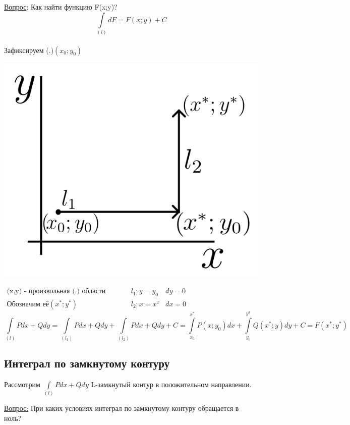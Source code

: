 \documentclass[12pt]{article}
\let\ORIincludegraphics\includegraphics
\renewcommand{\includegraphics}[2][]{\ORIincludegraphics[scale=0.65,#1]{#2}}
\let\oldint\int
\renewcommand{\int}{\oldint\limits}
\begin{document}
  
  \begin{minipage}{0.55\textwidth}
    \underline{Вопрос}: Как найти функцию F(x;y)?\\
    \[\int_{(l)}dF=F(x;y)+C\]\\
    Зафиксируем (.)$(x_0;y_0)$
  \end{minipage}
  \hspace{1em}
  \begin{minipage}{0.45\textwidth}
    \includegraphics[scale=0.6]{8.7.2.png}
  \end{minipage}
  \vspace{1em}
  \par
  $\begin{matrix}
    \text{(x,y) - произвольная (.) области } & \hspace{20pt} & l_1: y=y_0 & dy=0\\
    \text{Обозначим её} (x^*;y^*) & \hspace{20pt} & l_2:x=x^x & dx=0
  \end{matrix}$\\
  \[\int_{(l)}Pdx+Qdy=\int_{(l_1)}Pdx+Qdy+\int_{(l_2)}Pdx+Qdy+C = \int_{x_0}^{x^*}P(x;y_0)dx+
  \int_{y_0}^{y^x}Q(x^*;y)dy+C=F(x^*;y^*)\]
  \subsection{Интеграл по замкнутому контуру}
  Рассмотрим $\int_{(l)}Pdx+Qdy$ L-замкнутый контур в положительном направлении.
  \begin{center}
    \underline{Вопрос:} При каких условиях интеграл по замкнутому контуру обращается в ноль?
  \end{center}
\end{document}
